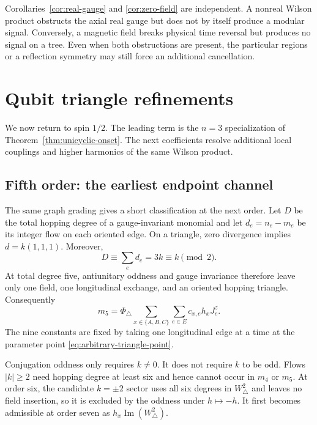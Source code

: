 \documentclass[11pt]{article}
\newcommand{\PhiTri}{\Phi_\triangle}
\begin{document}
Corollaries~\ref{cor:real-gauge} and \ref{cor:zero-field} are independent.  A
nonreal Wilson product obstructs the axial real gauge but does not by itself
produce a modular signal.  Conversely, a magnetic field breaks physical time
reversal but produces no signal on a tree.  Even when both obstructions are
present, the particular regions or a reflection symmetry may still force an
additional cancellation.





\section{Qubit triangle refinements}
\label{sec:triangle-refinements}

We now return to spin $1/2$.  The leading term is the $n=3$ specialization
of Theorem~\ref{thm:unicyclic-onset}.  The next coefficients resolve
additional local couplings and higher harmonics of the same Wilson product.

\subsection{Fifth order: the earliest endpoint channel}

The same graph grading gives a short classification at the next order.  Let
$D$ be the total hopping degree of a gauge-invariant monomial and let
$d_e=n_e-m_e$ be its integer flow on each oriented edge.  On a triangle,
zero divergence implies $d=k(1,1,1)$.  Moreover,
\begin{equation}
 D\equiv\sum_e d_e=3k\equiv k\pmod 2.
 \label{eq:flow-parity}
\end{equation}
At total degree five, antiunitary oddness and gauge invariance therefore leave
only one field, one longitudinal exchange, and an oriented hopping
triangle.  Consequently
\begin{equation}
 m_5=\PhiTri\sum_{x\in\{A,B,C\}}\sum_{e\in E}c_{x,e}h_xJ_e^z.
 \label{eq:m5-classification}
\end{equation}
The nine constants are fixed by taking one longitudinal edge at a time at the
parameter point \eqref{eq:arbitrary-triangle-point}.

Conjugation oddness only requires $k\neq0$.  It does not require $k$ to be
odd.  Flows $|k|\ge2$ need hopping degree at least six and hence cannot
occur in $m_4$ or $m_5$.  At order six, the candidate $k=\pm2$ sector uses
all six degrees in $W_\triangle^2$ and leaves no field insertion, so it is
excluded by the oddness under $h\mapsto-h$.  It first becomes admissible at
order seven as $h_x\operatorname{Im}(W_\triangle^2)$.
\end{document}
